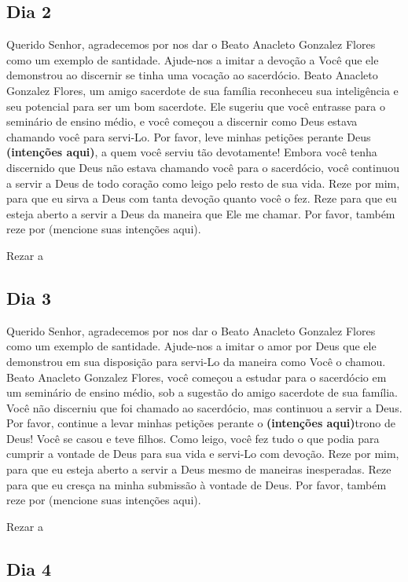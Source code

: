 \documentclass[a4paper,14pt,twoside]{extarticle} \usepackage[utf8]{inputenc}
\begin{document}
\subsection{Dia 2}

Querido Senhor, agradecemos por nos dar o Beato Anacleto Gonzalez Flores como um exemplo de santidade. Ajude-nos a imitar a devoção a Você que ele demonstrou ao discernir se tinha uma vocação ao sacerdócio. Beato Anacleto Gonzalez Flores, um amigo sacerdote de sua família reconheceu sua inteligência e seu potencial para ser um bom sacerdote. Ele sugeriu que você entrasse para o seminário de ensino médio, e você começou a discernir como Deus estava chamando você para servi-Lo. Por favor, leve minhas petições perante Deus \textbf{(intenções aqui)}, a quem você serviu tão devotamente! Embora você tenha discernido que Deus não estava chamando você para o sacerdócio, você continuou a servir a Deus de todo coração como leigo pelo resto de sua vida. Reze por mim, para que eu sirva a Deus com tanta devoção quanto você o fez. Reze para que eu esteja aberto a servir a Deus da maneira que Ele me chamar. Por favor, também reze por (mencione suas intenções aqui). 

Rezar a \textbf{}

\subsection{Dia 3}

Querido Senhor, agradecemos por nos dar o Beato Anacleto Gonzalez Flores como um exemplo de santidade. Ajude-nos a imitar o amor por Deus que ele demonstrou em sua disposição para servi-Lo da maneira como Você o chamou. Beato Anacleto Gonzalez Flores, você começou a estudar para o sacerdócio em um seminário de ensino médio, sob a sugestão do amigo sacerdote de sua família. Você não discerniu que foi chamado ao sacerdócio, mas continuou a servir a Deus. Por favor, continue a levar minhas petições perante o  \textbf{(intenções aqui)}trono de Deus! Você se casou e teve filhos. Como leigo, você fez tudo o que podia para cumprir a vontade de Deus para sua vida e servi-Lo com devoção. Reze por mim, para que eu esteja aberto a servir a Deus mesmo de maneiras inesperadas. Reze para que eu cresça na minha submissão à vontade de Deus. Por favor, também reze por (mencione suas intenções aqui). 

Rezar a \textbf{}

\subsection{Dia 4}
\end{document}
